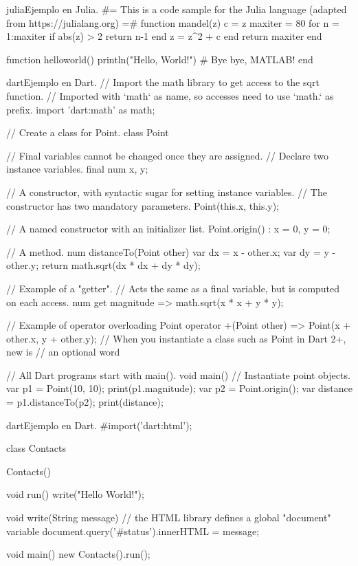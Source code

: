 \begin{sourcecode}{julia}{Ejemplo en Julia.}
#= This is a code sample for the Julia language
(adapted from https://julialang.org) =#
function mandel(z)
    c = z
    maxiter = 80
    for n = 1:maxiter
        if abs(z) > 2
            return n-1
        end
        z = z^2 + c
    end
    return maxiter
end

function helloworld()
    println("Hello, World!") # Bye bye, MATLAB!
end
\end{sourcecode}

\begin{sourcecode}{dart}{Ejemplo en Dart.}
// Import the math library to get access to the sqrt function.
// Imported with `math` as name, so accesses need to use `math.` as prefix.
import 'dart:math' as math;

// Create a class for Point.
class Point {

  // Final variables cannot be changed once they are assigned.
  // Declare two instance variables.
  final num x, y;

  // A constructor, with syntactic sugar for setting instance variables.
  // The constructor has two mandatory parameters.
  Point(this.x, this.y);

  // A named constructor with an initializer list.
  Point.origin()
      : x = 0,
        y = 0;

  // A method.
  num distanceTo(Point other) {
    var dx = x - other.x;
    var dy = y - other.y;
    return math.sqrt(dx * dx + dy * dy);
  }
  
  // Example of a "getter".
  // Acts the same as a final variable, but is computed on each access.
  num get magnitude => math.sqrt(x * x + y * y);

  // Example of operator overloading
  Point operator +(Point other) => Point(x + other.x, y + other.y);
  // When you instantiate a class such as Point in Dart 2+, new is 
  // an optional word
}

// All Dart programs start with main().
void main() {
  // Instantiate point objects.
  var p1 = Point(10, 10);
  print(p1.magnitude);
  var p2 = Point.origin();
  var distance = p1.distanceTo(p2);
  print(distance);
}
\end{sourcecode}

\begin{sourcecode}{dart}{Ejemplo en Dart.}
#import('dart:html');

class Contacts {

  Contacts() {
  }

  void run() {
    write("Hello World!");
  }

  void write(String message) {
    // the HTML library defines a global "document" variable
    document.query('#status').innerHTML = message;
  }
}

void main() {
  new Contacts().run();
}
\end{sourcecode}

